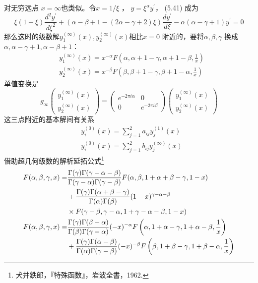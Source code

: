 对无穷远点 $x=\infty $也类似。令$ x=1/\xi$ ， $y=\xi^{\alpha} y^{\prime} $， (5.41) 成为
\begin{equation}
	\xi(1-\xi) \frac{d^{2} y^{\prime}}{d \xi^{2}}+(\alpha-\beta+1-(2 \alpha-\gamma+2) \xi) \frac{d y^{\prime}}{d \xi}-\alpha(\alpha-\gamma+1) y^{\prime}=0
\end{equation} 
那么这时的级数解$ y_{1}^{(\infty)}(x), y_{2}^{(\infty)}(x) $相比$ x=0$ 附近的，要将$ \alpha,\beta,\gamma$ 换成 $\alpha,\alpha-\gamma+1,\alpha-\beta+1$：
\begin{equation}
	\begin{aligned} &y_{1}^{(\infty)}(x)=x^{-\alpha} F\left(\alpha, \alpha+1-\gamma, \alpha+1-\beta, \frac{1}{x}\right) \\ &y_{2}^{(\infty)}(x)=x^{-\beta} F\left(\beta, \beta+1-\gamma, \beta+1-\alpha, \frac{1}{x}\right) \end{aligned}
\end{equation}
单值变换是
\begin{equation}
	g_{\infty}\left(\begin{array}{c} y_{1}^{(\infty)}(x) \\ y_{2}^{(\infty)}(x) \end{array}\right)=\left(\begin{array}{cc} e^{-2 \pi i \alpha} & 0 \\ 0 & e^{-2 \pi i \beta} \end{array}\right)\left(\begin{array}{l} y_{1}^{(\infty)}(x) \\ y_{2}^{(\infty)}(x) \end{array}\right)
\end{equation} 
这三点附近的基本解间有关系
\begin{align} &y_{i}^{(0)}(x)=\sum_{j=1}^{2} a_{i j} y_{j}^{(1)}(x) \\ &y_{i}^{(0)}(x)=\sum_{j=1}^{2} b_{i j} y_{j}^{(\infty)}(x) \end{align}
借助超几何级数的解析延拓公式\footnote{犬井鉄郎，『特殊函数』，岩波全書，1962.}
\begin{align} F(\alpha, \beta, \gamma, x)=& \frac{\Gamma(\gamma) \Gamma(\gamma-\alpha-\beta)}{\Gamma(\gamma-\alpha) \Gamma(\gamma-\beta)} F(\alpha, \beta, 1+\alpha+\beta-\gamma, 1-x) \notag\\ &+\frac{\Gamma(\gamma) \Gamma(\alpha+\beta-\gamma)}{\Gamma(\alpha) \Gamma(\beta)}(1-x)^{\gamma-\alpha-\beta} \\ & \times F(\gamma-\beta, \gamma-\alpha, 1+\gamma-\alpha-\beta, 1-x)\notag\\ F(\alpha, \beta, \gamma, x)=& \frac{\Gamma(\gamma) \Gamma(\beta-\alpha)}{\Gamma(\beta) \Gamma(\gamma-\alpha)}(-x)^{-\alpha} F\left(\alpha, 1+\alpha-\gamma, 1+\alpha-\beta, \frac{1}{x}\right) \notag\\ &+\frac{\Gamma(\gamma) \Gamma(\alpha-\beta)}{\Gamma(\alpha) \Gamma(\gamma-\beta)}(-x)^{-\beta} F\left(\beta, 1+\beta-\gamma, 1+\beta-\alpha, \frac{1}{x}\right) \end{align}
